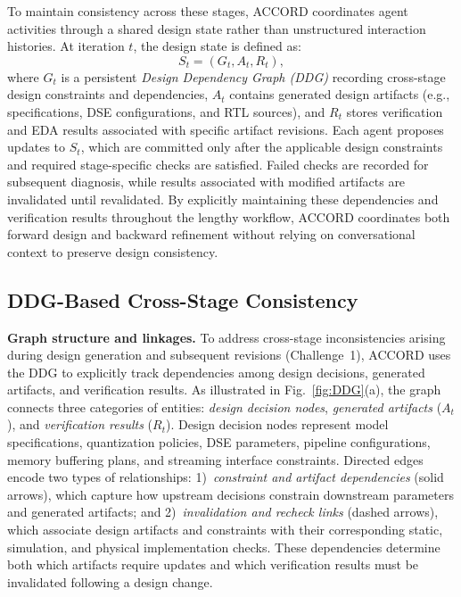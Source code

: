 \documentclass[9pt,conference]{IEEEtran}
\begin{document}
To maintain consistency across these stages, ACCORD coordinates agent activities through a shared design state rather than unstructured interaction histories. At iteration $t$, the design state is defined as:
\begin{equation}
S_t = (G_t, A_t, R_t),
\end{equation}
where $G_t$ is a persistent \emph{Design Dependency Graph (DDG)} recording cross-stage design constraints and dependencies, $A_t$ contains generated design artifacts (e.g., specifications, DSE configurations, and RTL sources), and $R_t$ stores verification and EDA results associated with specific artifact revisions. Each agent proposes updates to $S_t$, which are committed only after the applicable design constraints and required stage-specific checks are satisfied. Failed checks are recorded for subsequent diagnosis, while results associated with modified artifacts are invalidated until revalidated. By explicitly maintaining these dependencies and verification results throughout the lengthy workflow, ACCORD coordinates both forward design and backward refinement without relying on conversational context to preserve design consistency.

\subsection{DDG-Based Cross-Stage Consistency}
\textbf{Graph structure and linkages.}
To address cross-stage inconsistencies arising during design generation and subsequent revisions (Challenge~1), ACCORD uses the DDG to explicitly track dependencies among design decisions, generated artifacts, and verification results. As illustrated in Fig.~\ref{fig:DDG}(a), the graph connects three categories of entities: \emph{design decision nodes}, \emph{generated artifacts} ($A_t$), and \emph{verification results} ($R_t$). Design decision nodes represent model specifications, quantization policies, DSE parameters, pipeline configurations, memory buffering plans, and streaming interface constraints. Directed edges encode two types of relationships:
1)~\emph{constraint and artifact dependencies} (solid arrows), which capture how upstream decisions constrain downstream parameters and generated artifacts; and
2)~\emph{invalidation and recheck links} (dashed arrows), which associate design artifacts and constraints with their corresponding static, simulation, and physical implementation checks. These dependencies determine both which artifacts require updates and which verification results must be invalidated following a design change.
\end{document}
